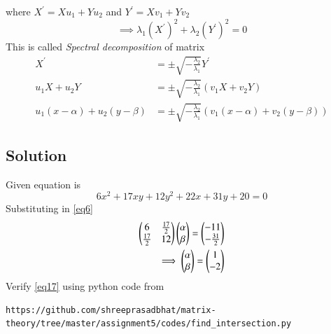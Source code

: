\documentclass[journal,12pt,twocolumn]{IEEEtran}
\begin{document}
where $X^\prime = Xu_1 + Yu_2$ and $Y^\prime = Xv_1 + Yv_2$
\begin{equation}\label{eq13}
	\implies \lambda_1 (X^\prime)^2 + \lambda_2 (Y^\prime)^2 = 0
\end{equation}
This is called \textit{Spectral decomposition} of matrix
\begin{align}
	X^\prime &= \pm \sqrt{-\frac{\lambda_2}{\lambda_1}}Y^\prime\\
	u_1X + u_2Y &= \pm \sqrt{-\frac{\lambda_2}{\lambda_1}}(v_1X + v_2Y)\\
	\label{eq14}u_1(x-\alpha) + u_2(y-\beta) &= \pm \sqrt{-\frac{\lambda_2}{\lambda_1}}(v_1(x-\alpha) + v_2(y-\beta))
\end{align}
\subsection{Solution}
Given equation is
\begin{equation}\label{eq15}
	6x^2 + 17xy + 12y^2 + 22x + 31y + 20 = 0
\end{equation}
Substituting in \eqref{eq6}
\begin{align}
	\label{eq16}\begin{pmatrix} 6 & \frac{17}{2}\\\frac{17}{2} & 12\end{pmatrix}\begin{pmatrix}\alpha \\ \beta\end{pmatrix} = \begin{pmatrix}-11 \\ -\frac{31}{2}\end{pmatrix} \\
	\label{eq17}\implies \begin{pmatrix}\alpha \\ \beta\end{pmatrix} = \begin{pmatrix}1 \\ -2\end{pmatrix}
\end{align}
Verify  \eqref{eq17} using python code from
\begin{lstlisting}
https://github.com/shreeprasadbhat/matrix-theory/tree/master/assignment5/codes/find_intersection.py
\end{lstlisting}
\end{document}
